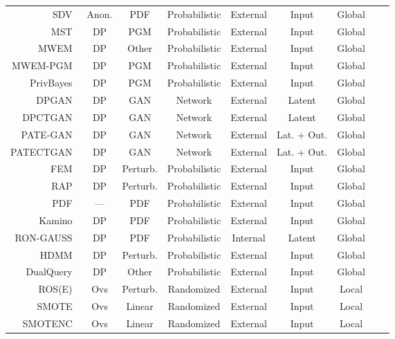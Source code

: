 \begin{longtable}{rcccccccc}
    \bottomrule
    \endlastfoot
    SDV~\cite{patki2016synthetic} & Anon. & PDF & Probabilistic & External & Input & Global \\
    MST~\cite{mckenna2021winning} & DP & PGM & Probabilistic & External & Input & Global \\
    MWEM~\cite{hardt2012simple} & DP & Other & Probabilistic & External & Input & Global \\
    MWEM-PGM~\cite{mckenna2019graphical} & DP & PGM & Probabilistic & External & Input & Global \\
    PrivBayes~\cite{zhang2017privbayes} & DP & PGM & Probabilistic & External & Input & Global \\
    DPGAN~\cite{xie2018differentially} & DP & GAN & Network & External & Latent & Global \\
    DPCTGAN~\cite{rosenblatt2020differentially} & DP & GAN &  Network & External & Latent & Global \\
    PATE-GAN~\cite{jordon2018pate} & DP & GAN & Network & External & Lat. + Out. & Global \\
    PATECTGAN~\cite{rosenblatt2020differentially} & DP & GAN & Network & External & Lat. + Out. & Global \\
    FEM~\cite{vietri2020new} & DP & Perturb. & Probabilistic & External & Input & Global \\
    RAP~\cite{aydore2021differentially} & DP & Perturb. & Probabilistic & External & Input & Global \\
    PDF~\cite{de2019formal, suciu2011probabilistic} & --- & PDF & Probabilistic & External & Input & Global \\
    Kamino~\cite{ge2021kamino} & DP & PDF & Probabilistic & External & Input & Global \\
    RON-GAUSS~\cite{chanyaswad2019ron} & DP & PDF & Probabilistic & Internal & Latent & Global \\
    HDMM~\cite{mckenna2018optimizing} & DP & Perturb. & Probabilistic & External & Input & Global \\
    DualQuery~\cite{gaboardi2014dual} & DP & Other & Probabilistic & External & Input & Global \\
    ROS(E)~\cite{menardi2014training} & Ovs & Perturb. & Randomized & External & Input & Local \\ 
    SMOTE~\cite{chawla2002smote} & Ovs & Linear & Randomized & External & Input & Local \\
    SMOTENC~\cite{chawla2002smote} & Ovs & Linear & Randomized & External & Input & Local \\

\end{longtable}
